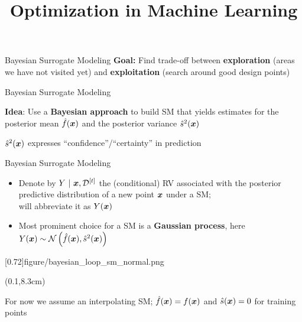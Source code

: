 \documentclass[11pt,compress,t,notes=noshow, xcolor=table]{beamer}
\title{Optimization in Machine Learning}
\begin{document}

\begin{framev}{Bayesian Surrogate Modeling}
\textbf{Goal:}
Find trade-off between \textbf{exploration} (areas we have not visited yet) and \textbf{exploitation} (search around good design points)
\vfill
{}
\end{framev}


\begin{framei}{Bayesian Surrogate Modeling}
\item \textbf{Idea}: Use a \textbf{Bayesian approach} to build SM that yields estimates for the posterior mean $\hat{f}(\bm{x})$ and the posterior variance $\hat{s}^2(\bm{x})$
\item $\hat{s}^2(\bm{x})$ expresses \enquote{confidence}/\enquote{certainty} in prediction
\vfill
{}
\end{framei}


\begin{framev}[align=top]{Bayesian Surrogate Modeling}
\begin{itemize}
\item Denote by $Y~|~\bm{x}, \mathcal{D}^{[t]}$ the (conditional) RV associated with the posterior predictive distribution of a new point $\bm{x}$ under a SM;\\
will abbreviate it as $Y(\bm{x})$
\item Most prominent choice for a SM is a \textbf{Gaussian process}, here $Y(\bm{x}) \sim \mathcal{N}\left(\hat{f}(\bm{x}), \hat{s}^2(\bm{x})\right)$
\end{itemize}
\imageFixed{3.5cm}{3.5cm}[0.72]{figure/bayesian_loop_sm_normal.png}
\begin{textblock*}{\linewidth}(0.1\linewidth,8.3cm)
\begin{footnotesize}
For now we assume an interpolating SM; $\hat{f}(\bm{x}) = f(\bm{x})$ and $\hat{s}(\bm{x}) = 0$ for training points
\end{footnotesize}
\end{textblock*}
\end{framev}
\end{document}

